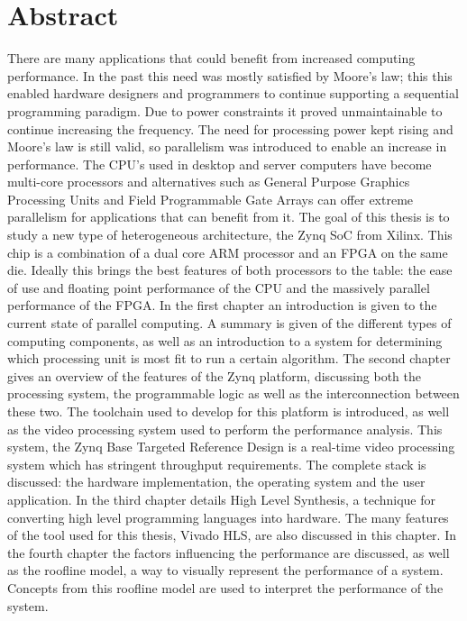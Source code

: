 

\chapter*{Abstract}

There are many applications that could benefit from increased computing performance. In the past this need was mostly satisfied by Moore's law; this this enabled hardware designers and programmers to continue supporting a sequential programming paradigm. Due to power constraints it proved unmaintainable to continue increasing the frequency. The need for processing power kept rising and Moore's law is still valid, so parallelism was introduced to enable an increase in performance. The CPU's used in desktop and server computers have become multi-core processors and alternatives such as General Purpose Graphics Processing Units and Field Programmable Gate Arrays can offer extreme parallelism for applications that can benefit from it. The goal of this thesis is to study a new type of heterogeneous architecture, the Zynq SoC from Xilinx. This chip is a combination of a dual core ARM processor and an FPGA on the same die. Ideally this brings the best features of both processors to the table: the ease of use and floating point performance of the CPU and the massively parallel performance of the FPGA. In the first chapter an introduction is given to the current state of parallel computing. A summary is given of the different types of computing components, as well as an introduction to a system for determining which processing unit is most fit to run a certain algorithm. The second chapter gives an overview of the features of the Zynq platform, discussing both the processing system, the programmable logic as well as the interconnection between these two. The toolchain used to develop for this platform is introduced, as well as the video processing system used to perform the performance analysis. This system, the Zynq Base Targeted Reference Design is a real-time video processing system which has stringent throughput requirements. The complete stack is discussed: the hardware implementation, the operating system and the user application. In the third chapter details High Level Synthesis, a technique for converting high level programming languages into hardware. The many features of the tool used for this thesis, Vivado HLS, are also discussed in this chapter. In the fourth chapter the factors influencing the performance are discussed, as well as the roofline model, a way to visually represent the performance of a system. Concepts from this roofline model are used to interpret the performance of the system.